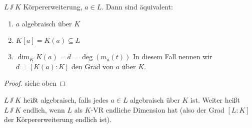 \documentclass[12pt,a4paper]{scrartcl}
\begin{document}
\begin{satz}[15.1]
	$L\sslash K$ Körpererweiterung, $a\in L$. Dann sind äquivalent:
	\begin{enumerate}
		\item $a$ algebraisch über $K$
		\item $K[a] = K(a) \subseteq L$
		\item $\dim_KK(a) = d = \deg(m_a(t))$
		In diesem Fall nennen wir $ d = [K(a):K]$ den Grad von $a$ über $K$.
	\end{enumerate}
\end{satz}
\begin{proof}
	siehe oben
\end{proof}
\begin{defi}
	$L\sslash K$ heißt algebraisch, falls jedes $a\in L$ algebraisch über $K$ ist. Weiter heißt $L\sslash K$ endlich, wenn $L$ als $K$-VR endliche Dimension hat (also der Grad $[L:K]$ der Körpererweiterung endlich ist).
\end{defi}	
	
\end{document}
